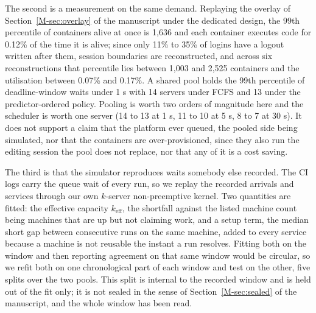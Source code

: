 \documentclass[mathematics,supfile,submit,moreauthors]{Definitions/mdpi}
\newcommand{\devnum}[1]{#1}
\begin{document}
The second is a measurement on the same demand. Replaying the overlay of
Section~\ref*{M-sec:overlay} of the manuscript under the dedicated design, the 99th percentile of containers
alive at once is \devnum{1{,}636} and each container executes code for \devnum{0.12\%} of
the time it is alive; since only \devnum{11\%} to \devnum{35\%} of logins have a logout
written after them, session boundaries are reconstructed, and across six reconstructions
that percentile lies between \devnum{1{,}003} and \devnum{2{,}525} containers and the
utilisation between \devnum{0.07\%} and \devnum{0.17\%}. A shared pool holds the 99th
percentile of deadline-window waits under \devnum{1} s with \devnum{14} servers under
FCFS and \devnum{13} under the predictor-ordered policy. Pooling is worth two orders of
magnitude here and the scheduler is worth one server (\devnum{14} to \devnum{13} at
\devnum{1} s, \devnum{11} to \devnum{10} at \devnum{5} s, \devnum{8} to \devnum{7} at
\devnum{30} s). It does not support a claim that the platform ever queued, the pooled
side being simulated, nor that the containers are over-provisioned, since they also run
the editing session the pool does not replace, nor that any of it is a cost saving.

The third is that the simulator reproduces waits somebody else recorded. The CI logs carry
the queue wait of every run, so we replay the recorded arrivals and services through our
own $k$-server non-preemptive kernel. Two quantities are fitted: the effective capacity
$k_{\mathrm{eff}}$, the shortfall against the listed machine count being machines that are
up but not claiming work, and a setup term, the median short gap between consecutive runs
on the same machine, added to every service because a machine is not reusable the instant
a run resolves. Fitting both on the window and then reporting agreement on that same
window would be circular, so we refit both on one chronological part of each window and
test on the other, five splits over the two pools.
This split is internal to the recorded window and is held out of the fit only; it
is not sealed in the sense of Section~\ref*{M-sec:sealed} of the manuscript, and the whole window has
been read.
\end{document}
